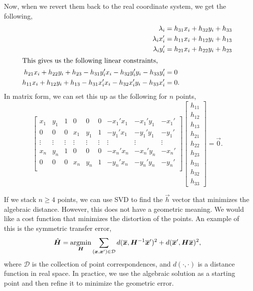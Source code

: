 Now, when we revert them back to the real coordinate system, we get the
following,
\begin{align*}
  \lambda_i &= h_{31}x_i + h_{32}y_i + h_{33} \\
  \lambda_i x_i' &= h_{11}x_i + h_{12}y_i + h_{13} \\
  \lambda_i y_i' &= h_{21}x_i + h_{22}y_i + h_{23} \\
  \intertext{This gives us the following linear constraints,}
  h_{21}x_i + h_{22}y_i + h_{23} - h_{31}y_i'x_i - h_{32}y_i'y_i - h_{33}y_i' &= 0 \\
  h_{11}x_i + h_{12}y_i + h_{13} - h_{31}x_i'x_i - h_{32}x_i'y_i - h_{33}x_i' &= 0
.\end{align*}
In matrix form, we can set this up as the following for $n$ points, \[
  \begin{bmatrix}
    x_1 & y_1 & 1 & 0 & 0 & 0 & -x_1'x_1 & -x_1'y_1 & -x_1' \\
    0 & 0 & 0 & x_1 & y_1 & 1 & -y_1'x_1 & -y_1'y_1 & -y_1' \\
    \vdots & \vdots & \vdots & \vdots & \vdots & \vdots & \vdots & \vdots & \vdots \\
    x_n & y_n & 1 & 0 & 0 & 0 & -x_n'x_n & -x_n'y_n & -x_n' \\
    0 & 0 & 0 & x_n & y_n & 1 & -y_n'x_n & -y_n'y_n & -y_n' \\
  \end{bmatrix}
  \begin{bmatrix}
    h_{11} \\
    h_{12} \\
    h_{13} \\
    h_{21} \\
    h_{22} \\
    h_{23} \\
    h_{31} \\
    h_{32} \\
    h_{33}
  \end{bmatrix}
  =
  \vec{0}
.\]

If we stack $n \geq 4$ points, we can use SVD to find the $\vec{h}$ vector that
minimizes the algebraic distance. However, this does not have a geometric
meaning. We would like a cost function that minimizes the distortion of the
points. An example of this is the symmetric transfer error, \[
  \hat{\bm{H}} = \operatorname*{argmin}_{\bm{H}}
  \sum_{(\bm{x},\bm{x}')\in\mathcal{D}}
  d(\overline{\bm{x}},\bm{H}^{-1}\overline{\bm{x}}')^2 +
  d(\overline{\bm{x}}', \bm{H}\overline{\bm{x}})^2
,\]
where $\mathcal{D}$ is the collection of point correspondences, and $d(\cdot,
\cdot)$ is a distance function in real space. In practice, we use the algebraic
solution as a starting point and then refine it to minimize the geometric error.
